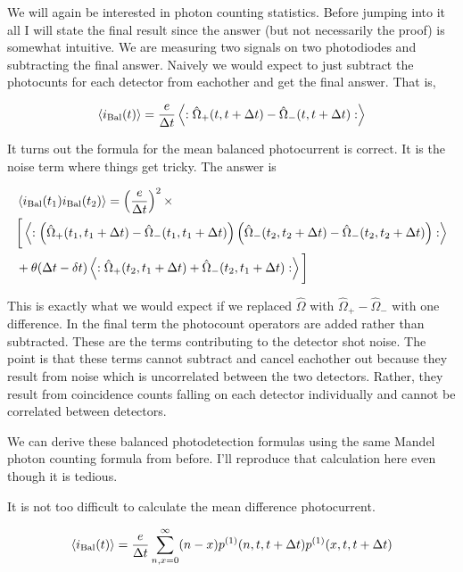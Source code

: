 \documentclass[12pt]{article}
\begin{document}
We will again be interested in photon counting statistics. Before jumping into it all I will state the final result since the answer (but not necessarily the proof) is somewhat intuitive. We are measuring two signals on two photodiodes and subtracting the final answer. Naively we would expect to just subtract the photocunts for each detector from eachother and get the final answer. That is,

\begin{align}
\braket{i_{\text{Bal}}(t)} = \frac{e}{\Delta t} \left<:\hat{\Omega}_+(t,t+\Delta t) - \hat{\Omega}_-(t,t+\Delta t) :\right>
\end{align}

It turns out the formula for the mean balanced photocurrent is correct. It is the noise term where things get tricky. The answer is

\begin{align}
&\braket{i_{\text{Bal}}(t_1)i_{\text{Bal}}(t_2)} = \left(\frac{e}{\Delta t}\right)^2 \times\\
&\bigg[ \left<: \left(\hat{\Omega}_+(t_1,t_1+\Delta t) - \hat{\Omega}_-(t_1,t_1+\Delta t)\right)\left(\hat{\Omega}_-(t_2,t_2+\Delta t) - \hat{\Omega}_-(t_2,t_2+\Delta t)\right) : \right>\\
&+ \theta(\Delta t - \delta t)\left<:\hat{\Omega}_+( t_2,t_1+\Delta t)+\hat{\Omega}_-( t_2,t_1+\Delta t):\right>\bigg]
\end{align}

This is exactly what we would expect if we replaced $\hat{\Omega}$ with $\hat{\Omega}_+ - \hat{\Omega}_-$ with one difference. In the final term the photocount operators are added rather than subtracted. These are the terms contributing to the detector shot noise. The point is that these terms cannot subtract and cancel eachother out because they result from noise which is uncorrelated between the two detectors. Rather, they result from coincidence counts falling on each detector individually and cannot be correlated between detectors.

We can derive these balanced photodetection formulas using the same Mandel photon counting formula from before. I'll reproduce that calculation here even though it is tedious.

It is not too difficult to calculate the mean difference photocurrent.

\begin{align}
\braket{i_{\text{Bal}}(t)} = \frac{e}{\Delta t} \sum_{n,x=0}^{\infty} (n-x)p^{(1)}(n,t,t+\Delta t) p^{(1)}(x,t,t+\Delta t) 
\end{align}
\end{document}
